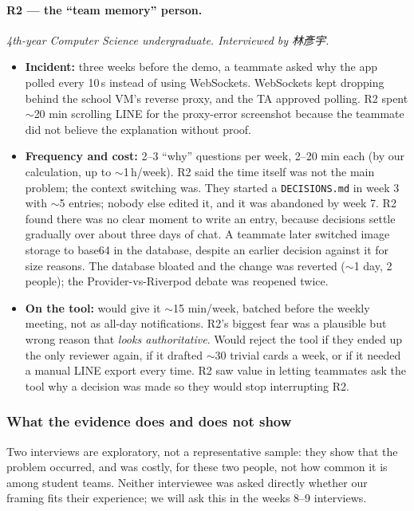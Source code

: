 \documentclass[11pt,a4paper]{article}
\newcommand{\code}[1]{\texttt{#1}}
\begin{document}
\paragraph{R2 --- the ``team memory'' person.}
\emph{4th-year Computer Science undergraduate. Interviewed by 林彥宇.}
\begin{itemize}
  \item \textbf{Incident:} three weeks before the demo, a teammate asked why the app polled every 10\,s instead of using WebSockets. WebSockets kept dropping behind the school VM's reverse proxy, and the TA approved polling. R2 spent $\sim$20 min scrolling LINE for the proxy-error screenshot because the teammate did not believe the explanation without proof.
  \item \textbf{Frequency and cost:} 2--3 ``why'' questions per week, 2--20 min each (by our calculation, up to $\sim$1\,h/week). R2 said the time itself was not the main problem; the context switching was. They started a \code{DECISIONS.md} in week 3 with $\sim$5 entries; nobody else edited it, and it was abandoned by week 7. R2 found there was no clear moment to write an entry, because decisions settle gradually over about three days of chat. A teammate later switched image storage to base64 in the database, despite an earlier decision against it for size reasons. The database bloated and the change was reverted ($\sim$1 day, 2 people); the Provider-vs-Riverpod debate was reopened twice.
  \item \textbf{On the tool:} would give it $\sim$15 min/week, batched before the weekly meeting, not as all-day notifications. R2's biggest fear was a plausible but wrong reason that \emph{looks authoritative}. Would reject the tool if they ended up the only reviewer again, if it drafted $\sim$30 trivial cards a week, or if it needed a manual LINE export every time. R2 saw value in letting teammates ask the tool why a decision was made so they would stop interrupting R2.
\end{itemize}

\subsubsection*{What the evidence does and does not show}

Two interviews are exploratory, not a representative sample: they show that the problem occurred, and was costly, for these two people, not how common it is among student teams. Neither interviewee was asked directly whether our framing fits their experience; we will ask this in the weeks 8--9 interviews.
\end{document}
